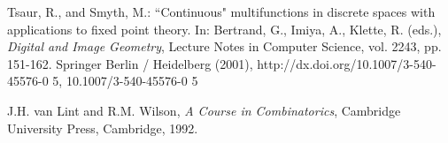 \documentclass{article}
\theoremstyle{plain}
\theoremstyle{definition}
\numberwithin{thm}{section}
\begin{document}
\begin{thebibliography}{11}
Tsaur, R., and Smyth, M.: ``Continuous" multifunctions in discrete spaces with applications to fixed point theory. In: Bertrand, G., Imiya, A., Klette, R. (eds.),
{\em Digital and Image Geometry}, 
Lecture Notes in Computer Science, vol. 2243, pp. 151-162. Springer Berlin / Heidelberg (2001),
http://dx.doi.org/10.1007/3-540-45576-0 5, 10.1007/3-540-45576-0 5

J.H. van Lint and R.M. Wilson,
{\em A Course in Combinatorics},
Cambridge University Press, Cambridge, 1992.
\end{thebibliography}
\end{document}
